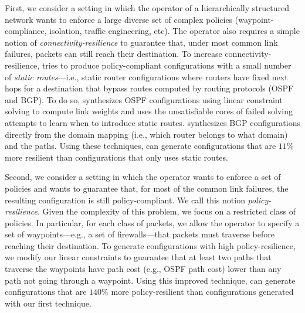 First, we consider a setting in which the operator of a hierarchically
structured network wants to enforce a large diverse set of complex
policies (waypoint-compliance, isolation, traffic engineering, etc).
The operator also requires a simple notion of
\emph{connectivity-resilience} to guarantee that, under most common
link failures, packets can still reach their destination.
To increase connectivity-resilience, \name tries to produce
policy-compliant configurations with a small number of {\em static
  routes}---i.e., static router configurations where routers have
fixed next hops for a destination that bypass routes computed by routing protocols (OSPF and BGP).
To do so, \name synthesizes OSPF configurations using linear constraint solving to compute
link weights and uses the unsatisfiable cores
of failed solving attempts to learn when to introduce static routes.
\name synthesizes BGP configurations directly from the domain mapping (i.e., which router belongs to what domain) and the paths.
Using these techniques, \name can generate configurations that are
$11\%$ more resilient than configurations that only uses static routes.

Second, we consider a setting in which the operator wants to enforce a
set of policies and wants to guarantee that, for most of the common
link failures, the resulting configuration is still policy-compliant.
We call this notion \emph{policy-resilience}.  Given the complexity of
this problem, we focus on a {\rm restricted class} of policies.  In
particular, for each class of packets, we allow the operator to
specify a set of waypoints---e.g., a set of firewalls---that packets
must traverse before reaching their destination.  To generate
configurations with high policy-resilience, we modify our linear
constraints to guarantee that at least two paths that traverse the
waypoints have path cost (e.g., OSPF path cost) lower than any path not
going through a waypoint.  Using this improved technique, \name can
generate configurations that are $140\%$ more policy-resilient than
configurations generated with our first technique.

